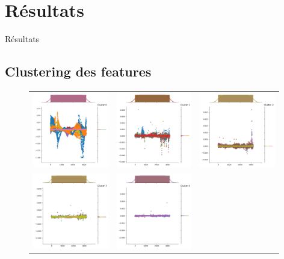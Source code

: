 \documentclass{beamer}
\begin{document}
\section{Résultats}\label{sec:res}
\begin{frame}{Résultats}
    \subsection{Clustering des features}\label{subsec:res-ft}
    \begin{figure}
        \begin{tabular}{ccc}
            \includegraphics[width=3.3cm]{clust/clust0.png}&
            \includegraphics[width=3.3cm]{clust/clust1.png}&
            \includegraphics[width=3.3cm]{clust/clust2.png}\\
            \includegraphics[width=3.3cm]{clust/clust3.png}&
            \includegraphics[width=3.3cm]{clust/clust4.png}&

\end{tabular}
\end{figure}
\end{frame}
\end{document}
